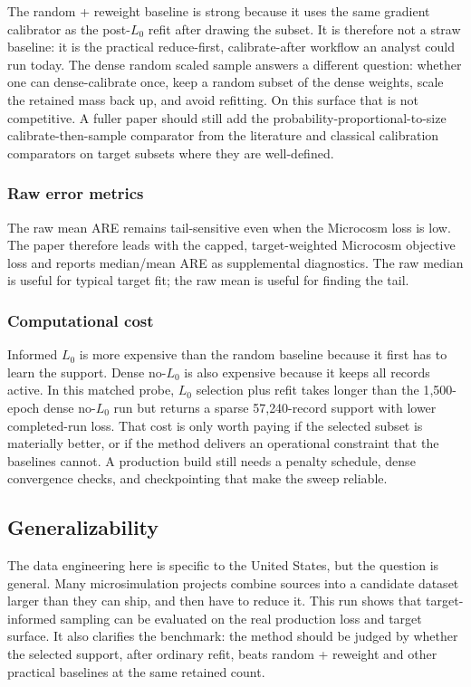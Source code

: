 The random + reweight baseline is strong because it uses the same gradient calibrator as the post-$L_0$
refit after drawing the subset. It is therefore not a straw baseline: it is the practical reduce-first,
calibrate-after workflow an analyst could run today. The dense random scaled sample answers a different
question: whether one can dense-calibrate once, keep a random subset of the dense weights, scale the
retained mass back up, and avoid refitting. On this surface that is not competitive. A fuller paper should
still add the probability-proportional-to-size calibrate-then-sample comparator from the literature and
classical calibration comparators on target subsets where they are well-defined.

\subsubsection{Raw error metrics}

The raw mean ARE remains tail-sensitive even when the Microcosm loss is low. The paper therefore leads with
the capped, target-weighted Microcosm objective loss and reports median/mean ARE as supplemental
diagnostics. The raw median is useful for typical target fit; the raw mean is useful for finding the tail.

\subsubsection{Computational cost}

Informed $L_0$ is more expensive than the random baseline because it first has to learn the support. Dense
no-$L_0$ is also expensive because it keeps all records active. In this matched probe, $L_0$ selection plus
refit takes longer than the 1{,}500-epoch dense no-$L_0$ run but returns a sparse 57{,}240-record support
with lower completed-run loss. That cost is only worth paying if the selected subset is materially better,
or if the method delivers an operational constraint that the baselines cannot. A production build still
needs a penalty schedule, dense convergence checks, and checkpointing that make the sweep reliable.

\subsection{Generalizability}

The data engineering here is specific to the United States, but the question is general. Many
microsimulation projects combine sources into a candidate dataset larger than they can ship, and then have
to reduce it. This run shows that target-informed sampling can be evaluated on the real production loss and
target surface. It also clarifies the benchmark: the method should be judged by whether the selected
support, after ordinary refit, beats random + reweight and other practical baselines at the same retained
count.
